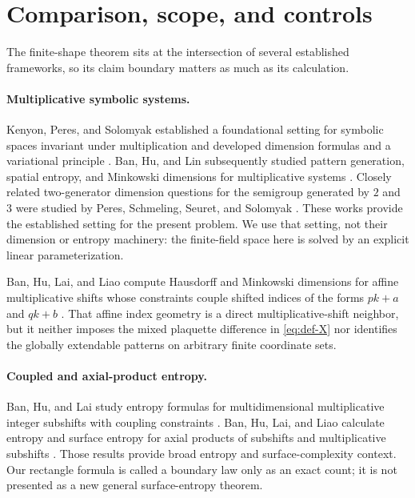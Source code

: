 \section{Comparison, scope, and controls}\label{sec:scope}

The finite-shape theorem sits at the intersection of several established
frameworks, so its claim boundary matters as much as its calculation.

\paragraph{Multiplicative symbolic systems.}
Kenyon, Peres, and Solomyak established a foundational setting for symbolic
spaces invariant under multiplication and developed dimension formulas and a
variational principle \citep{KenyonPeresSolomyak2012}.  Ban, Hu, and Lin
subsequently studied pattern generation, spatial entropy, and Minkowski
dimensions for multiplicative systems \citep{BanHuLin2019}.  Closely related
two-generator dimension questions for the semigroup generated by $2$ and $3$
were studied by Peres, Schmeling, Seuret, and Solomyak
\citep{PeresSchmelingSeuretSolomyak2014}.  These works provide the established
setting for the present problem.  We use that setting, not their dimension or
entropy machinery: the finite-field space here is solved by an explicit
linear parameterization.

Ban, Hu, Lai, and Liao compute Hausdorff and Minkowski dimensions for affine
multiplicative shifts whose constraints couple shifted indices of the forms
$pk+a$ and $qk+b$ \citep{BanHuLaiLiaoAffine2025}.  That affine index geometry is
a direct multiplicative-shift neighbor, but it neither imposes the mixed
plaquette difference in \eqref{eq:def-X} nor identifies the globally extendable
patterns on arbitrary finite coordinate sets.

\paragraph{Coupled and axial-product entropy.}
Ban, Hu, and Lai study entropy formulas for multidimensional multiplicative
integer subshifts with coupling constraints \citep{BanHuLai2021}.  Ban, Hu,
Lai, and Liao calculate entropy and surface entropy for axial products of
subshifts and multiplicative subshifts \citep{BanHuLaiLiao2025}.  Those
results provide broad entropy and surface-complexity context.  Our rectangle
formula is called a boundary law only as an exact count; it is not presented
as a new general surface-entropy theorem.

